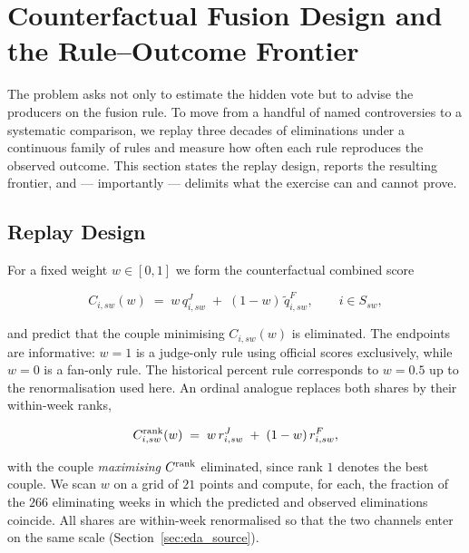 \section{Counterfactual Fusion Design and the Rule--Outcome Frontier}\label{sec:counterfactual}

The problem asks not only to estimate the hidden vote but to advise the producers on the
fusion rule. To move from a handful of named controversies to a systematic comparison, we
replay three decades of eliminations under a continuous family of rules and measure how often
each rule reproduces the observed outcome. This section states the replay design, reports the
resulting frontier, and --- importantly --- delimits what the exercise can and cannot prove.

\subsection{Replay Design}\label{sec:replaydesign}

For a fixed weight $w\in[0,1]$ we form the counterfactual combined score

\begin{equation}
\label{eq:weightedscore}
  C_{i,sw}(w) \;=\; w\,q^J_{i,sw} \;+\; (1-w)\,\tilde q^F_{i,sw},
  \qquad i\in S_{sw},
\end{equation}

and predict that the couple minimising $C_{i,sw}(w)$ is eliminated. The endpoints are
informative: $w=1$ is a judge-only rule using official scores exclusively, while $w=0$ is a
fan-only rule. The historical percent rule corresponds to $w=0.5$ up to the renorm\-alisation
used here. An ordinal analogue replaces both shares by their within-week ranks,

\begin{equation}
\label{eq:weightedrank}
  C^{\rm rank}_{i,sw}(w) \;=\; w\,r^J_{i,sw} \;+\; (1-w)\,r^F_{i,sw},
\end{equation}

with the couple \emph{maximising} $C^{\rm rank}$ eliminated, since rank $1$ denotes the best
couple. We scan $w$ on a grid of $21$ points and compute, for each, the fraction of the $266$
eliminating weeks in which the predicted and observed eliminations coincide. All shares are
within-week renormalised so that the two channels enter on the same scale
(Section~\ref{sec:eda_source}).

